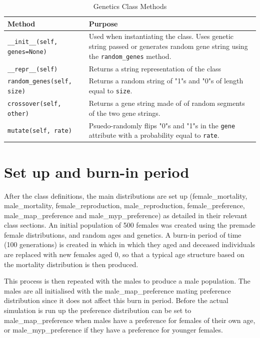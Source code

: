 \documentclass[authoryearcitations]{UoYCSproject}
\begin{document}
\begin{table}[h]
\caption{Genetics Class Methods}
\label{tbl:geneticsMethods}
\begin{tabular}{m{} m{}}
\textbf{Method} & \textbf{Purpose} \\\hline
\texttt{\_\_init\_\_(self, genes=None)} & Used when instantiating the class. Uses genetic string passed or generates random gene string using the \texttt{random\_genes} method.\\\hline
\texttt{\_\_repr\_\_(self)} & Returns a string representation of the class \\\hline
\texttt{random\_genes(self, size)} & Returns a random string of "1"s and "0"s of length equal to \texttt{size}. \\\hline
\texttt{crossover(self, other)} & Returns a gene string made of of random segments of the two gene strings. \\\hline
\texttt{mutate(self, rate)} & Psuedo-randomly flips "0"s and "1"s in the \texttt{gene} attribute with a probability equal to \texttt{rate}.
\end{tabular}
\end{table}

\newpage
\section{Set up and burn-in period}
After the class definitions, the main distributions are set up (female\_mortality, male\_mortality, female\_reproduction, male\_reproduction, female\_preference, male\_map\_preference and male\_myp\_preference) as detailed in their relevant class sections. An initial population of 500 females was created using the premade female distributions, and random ages and genetics. A burn-in period of time (100 generations) is created in which in which they aged and deceased individuals are replaced with new females aged 0, so that a typical age structure based on the mortality distribution is then produced. 

This process is then repeated with the males to produce a male population. The males are all initialised with the male\_map\_preference mating preference distribution since it does not affect this burn in period. Before the actual simulation is run up the preference distribution can be set to male\_map\_preference when males have a preference for females of their own age, or male\_myp\_preference if they have a preference for younger females. 
\end{document}

